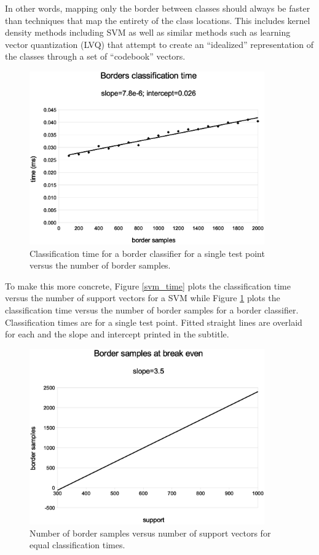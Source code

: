 \documentclass[11pt]{article}
\begin{document}
In other words, mapping only the border between classes should always be
faster than techniques that map the entirety of the class locations.
This includes kernel density methods including SVM as well
as similar methods such as learning vector quantization (LVQ) 
\citep{Kohonen2000, LVQ_PAK}
that attempt to create an ``idealized'' representation of the classes through
a set of ``codebook'' vectors.

\begin{figure}
\includegraphics[width=0.9\textwidth]{border_time}
\caption{Classification time for a border classifier for a single test point versus the number of border samples.}
\label{border_time}
\end{figure}

To make this more concrete, Figure \ref{svm_time}
plots the classification time versus the number of support vectors
for a SVM
while Figure \ref{border_time} plots the classification time
versus the number of border samples for a border classifier.
Classification times are for a single test point.
Fitted straight lines are overlaid for each and the slope and intercept 
printed in the subtitle.

\begin{figure}
\includegraphics[width=0.9\textwidth]{break_even}
\caption{Number of border samples versus number of support vectors for equal classification times.}
\label{break_even}
\end{figure}
\end{document}
